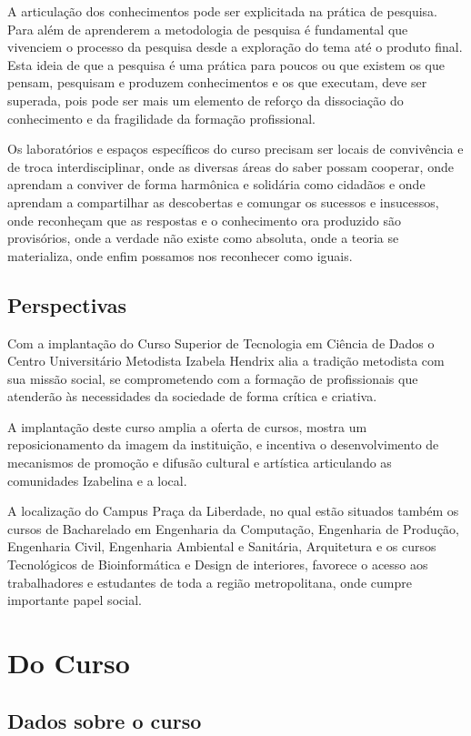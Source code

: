 \documentclass[a4paper, 12pt, openright, oneside, german, french, english, brazil]{abntex2}
\begin{document}
A articulação dos conhecimentos pode ser explicitada na prática de pesquisa. Para além de aprenderem a metodologia de pesquisa é fundamental que vivenciem o processo da pesquisa desde a exploração do tema até o produto final. Esta ideia de que a pesquisa é uma prática para poucos ou que existem os que pensam, pesquisam e produzem conhecimentos e os que executam, deve ser superada, pois pode ser mais um elemento de reforço da dissociação do conhecimento e da fragilidade da formação profissional.

Os laboratórios e espaços específicos do curso precisam ser locais de convivência e de troca interdisciplinar, onde as diversas áreas do saber possam cooperar, onde aprendam a conviver de forma harmônica e solidária como cidadãos e onde aprendam a compartilhar as descobertas e comungar os sucessos e insucessos, onde reconheçam que as respostas e o conhecimento ora produzido são provisórios, onde a verdade não existe como absoluta, onde a teoria se materializa, onde enfim possamos nos reconhecer como iguais.

\chapter{Perspectivas}

Com a implantação do Curso Superior de Tecnologia em Ciência de Dados o Centro Universitário Metodista Izabela Hendrix alia a tradição metodista com sua missão social, se comprometendo com a formação de profissionais que atenderão às necessidades da sociedade de forma crítica e criativa.

A implantação deste curso amplia a oferta de cursos, mostra um reposicionamento da imagem da instituição, e incentiva o desenvolvimento de mecanismos de promoção e difusão cultural e artística articulando as comunidades Izabelina e a local.

A localização do Campus Praça da Liberdade, no qual estão situados também os cursos de Bacharelado em Engenharia da Computação, Engenharia de Produção, Engenharia Civil, Engenharia Ambiental e Sanitária, Arquitetura e os cursos Tecnológicos de Bioinformática e Design de interiores, favorece o acesso aos trabalhadores e estudantes de toda a região metropolitana, onde cumpre importante papel social.


\part{Do Curso}

\chapter{Dados sobre o curso}
\end{document}
